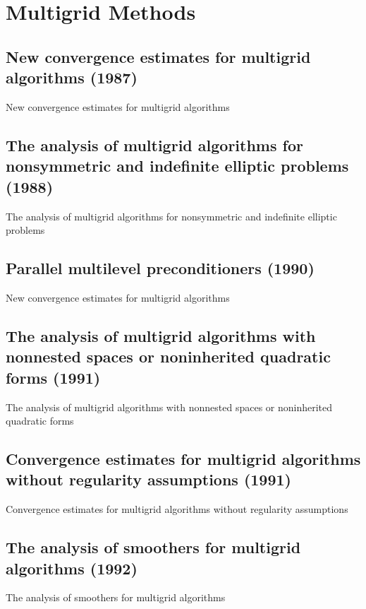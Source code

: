 \chapter{Multigrid Methods}


\section{New convergence estimates for multigrid algorithms (1987)}
New convergence estimates for multigrid algorithms\cite{bramble1987new}


\section{The analysis of multigrid algorithms for nonsymmetric and indefinite elliptic problems (1988)}
The analysis of multigrid algorithms for nonsymmetric and indefinite elliptic problems\cite{bramble1988analysis}


\section{Parallel multilevel preconditioners (1990)}
New convergence estimates for multigrid algorithms\cite{bramble1990parallel}


\section{The analysis of multigrid algorithms with nonnested spaces or noninherited quadratic forms (1991)}
The analysis of multigrid algorithms with nonnested spaces or noninherited quadratic forms\cite{bramble1991analysis}


\section{Convergence estimates for multigrid algorithms without regularity assumptions (1991)}
Convergence estimates for multigrid algorithms without regularity assumptions\cite{bramble1991convergencea}


\section{The analysis of smoothers for multigrid algorithms (1992)}
The analysis of smoothers for multigrid algorithms\cite{bramble1992analysis}


